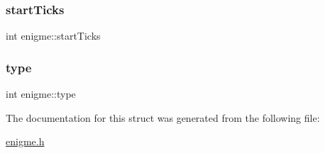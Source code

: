 \mbox{\label{structenigme_a1e1e6c58f33ffed48b4eda090889ca38}} 
\subsubsection{\texorpdfstring{start\+Ticks}{startTicks}}
{\footnotesize\ttfamily int enigme\+::start\+Ticks}

\mbox{\label{structenigme_a2dfaa436eec08235e9d171809c885625}} 
\subsubsection{\texorpdfstring{type}{type}}
{\footnotesize\ttfamily int enigme\+::type}



The documentation for this struct was generated from the following file\+:\begin{DoxyCompactItemize}
\item 
\hyperlink{enigme_8h}{enigme.\+h}\end{DoxyCompactItemize}
